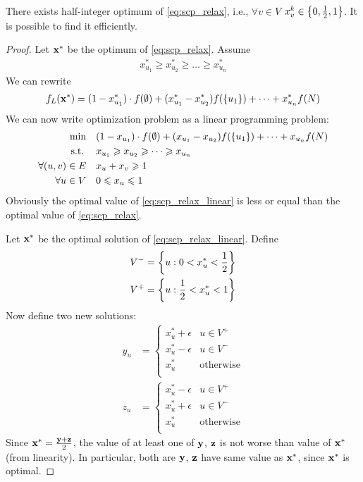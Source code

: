 \begin{prop}
	There exists half-integer optimum of \vref{eq:scp_relax}, i.e., $\forall v\in V$ $x_v^k \in \qty{0,\frac{1}{2}, 1}$. It is possible to find it efficiently.
	\begin{proof}
		Let $\vb{x}^*$ be the optimum of \vref{eq:scp_relax}. Assume 
		\begin{align}
		x^*_{u_1} \geqslant x^*_{u_2} \geqslant \dots \geqslant x^*_{u_n}
		\end{align}
		We can rewrite
		\begin{align}
		f_L(\vb{x}^*) = (1-x^*_{u_1}) \cdot f(\emptyset) + (x^*_{u_1}-x^*_{u_2})f(\qty{u_1}) + \dots + x^*_{u_n} f(N)
		\end{align}
		We can now write optimization problem as a linear programming problem:
		\begin{align} \label{eq:scp_relax_linear}
		\min \quad&  (1-x_{u_1}) \cdot f(\emptyset) + (x_{u_1}-x_{u_2})f(\qty{u_1}) + \dots + x_{u_n} f(N) \\ 
		\text{s.t.} \:  \quad&x_{u_1} \geqslant x_{u_2} \geqslant \dots \geqslant x_{u_n} \\
		\forall (u,v)\in E \quad&x_u+x_v \geqslant 1 \\
		\forall u \in V \quad&0\leqslant x_u \leqslant 1 
		\end{align}
		Obviously the optimal value of \vref{eq:scp_relax_linear} is less or equal than the optimal value of \vref{eq:scp_relax}.
		
		Let $\vb{x}^*$ be the optimal solution of \vref{eq:scp_relax_linear}. Define
		\begin{align}
		V^- &= \qty{ u : 0 < x^*_u <\frac{1}{2} }\\
		V^+ &= \qty{ u : \frac{1}{2} < x^*_u <1 }\\
		\end{align}
		Now define two new solutions:
		\begin{align}
		y_u &= \begin{cases}
		x^*_u + \epsilon & u \in V^+\\
		x^*_u - \epsilon & u \in V^-\\
		x^*_u & \text{otherwise}\\
		\end{cases}\\
		z_u &= \begin{cases}
		x^*_u - \epsilon & u \in V^+\\
		x^*_u + \epsilon & u \in V^-\\
		x^*_u & \text{otherwise}\\
		\end{cases}
		\end{align}
		Since $\vb{x}^* = \frac{\vb{y}+\vb{z}}{2}$, the value of at least one of $\vb{y}$, $\vb{z}$ is not worse than value of $\vb{x}^*$ (from linearity). In particular, both are $\vb{y}$, $\vb{z}$ have same value as $\vb{x}^*$, since $\vb{x}^*$ is optimal.
		

\end{proof}
\end{prop}

